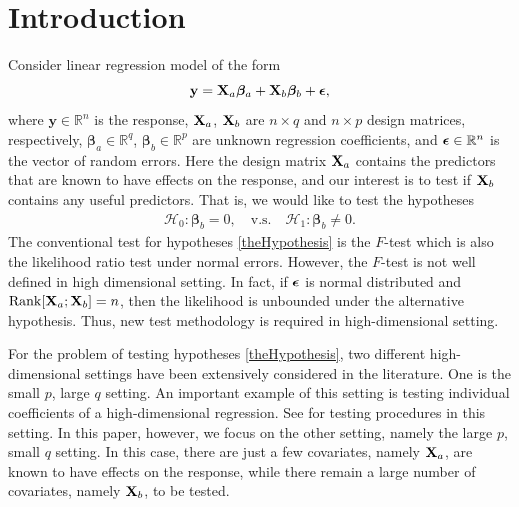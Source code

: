 \documentclass[bj]{imsart}
\DeclareMathOperator{\myRank}{Rank}
\newcommand{\By}{\mathbf{y}}    \newcommand{\Bz}{\mathbf{z}}
\newcommand{\bfsym}[1]{\ensuremath{\boldsymbol{#1}}}
\def\bbeta{\bfsym \beta}
\theoremstyle{plain}
\theoremstyle{definition}
\theoremstyle{remark}
\begin{document}
\section{Introduction} 
Consider linear regression model of the form
\begin{equation}\label{label:linearModel}
    \By = 
    \BX_a \bbeta_a + \BX_b \bbeta_b + \bepsilon, %
\end{equation}
where $\By \in \mathbb R^n$ is the response, $\mathbf{X}_a$, $\mathbf{X}_b$ are $n\times q$ and $n\times p$ design matrices, respectively,  $\bbeta_a\in \mathbb R^q$, $\bbeta_b\in \mathbb R^p$ are unknown regression coefficients, and 
$\bepsilon\in \mathbb R^n$ is the vector of random errors.
Here the design matrix $\mathbf{X}_a$ contains the predictors that are known to have effects on the response,
and our interest is to test if $\mathbf{X}_b$ contains any useful predictors.
That is, we would like to test the hypotheses
\begin{align}\label{theHypothesis}
    \mathcal H_0:   \bbeta_b =0,\quad
    \text{v.s.} \quad
    \mathcal H_1:   \bbeta_b \neq 0.
\end{align}
The conventional test for hypotheses \eqref{theHypothesis} is the $F$-test which is also the likelihood ratio test under normal errors.
However, the $F$-test is not well defined in high dimensional setting.
In fact, if $\bepsilon$ is normal distributed and $\myRank[\BX_a;\BX_b]=n$, then the likelihood is unbounded under the alternative hypothesis.
Thus, new test methodology is required in high-dimensional setting.

For the problem of testing hypotheses \eqref{theHypothesis}, two different high-dimensional settings have been extensively considered in the literature.
One is the small $p$, large $q$ setting.
An important example of this setting is testing individual coefficients of a high-dimensional regression.
See \citep{buhlmann2013statistical,Zhang2013,Lan2016} for testing procedures in this setting.
In this paper, however, we focus on the other setting, namely the large $p$, small $q$ setting.
In this case, there are just a few covariates, namely $\mathbf{X}_a$, are known to have effects on the response, while there remain a large number of covariates, namely $\mathbf{X}_b$, to be tested.
\end{document}
